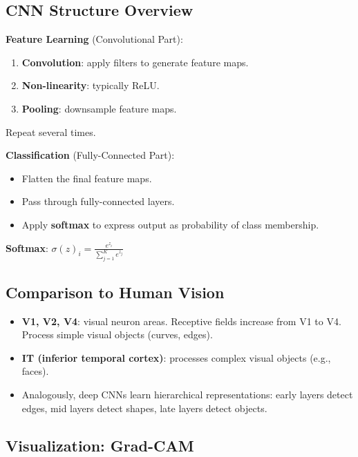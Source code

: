 \documentclass[11pt,a4paper]{article}
\begin{document}
\subsection{CNN Structure Overview}

\begin{tcolorbox}[colback=boxgray, colframe=leidenblue, title=\textbf{CNN for Classification}]
\textbf{Feature Learning} (Convolutional Part):
\begin{enumerate}[leftmargin=*]
    \item \textbf{Convolution}: apply filters to generate feature maps.
    \item \textbf{Non-linearity}: typically ReLU.
    \item \textbf{Pooling}: downsample feature maps.
\end{enumerate}
Repeat several times.

\smallskip
\textbf{Classification} (Fully-Connected Part):
\begin{itemize}[leftmargin=*]
    \item Flatten the final feature maps.
    \item Pass through fully-connected layers.
    \item Apply \textbf{softmax} to express output as probability of class membership.
\end{itemize}
\end{tcolorbox}

\textbf{Softmax}: $\sigma(z)_i = \frac{e^{z_i}}{\sum_{j=1}^K e^{z_j}}$

\subsection{Comparison to Human Vision}

\begin{itemize}[leftmargin=*]
    \item \textbf{V1, V2, V4}: visual neuron areas. Receptive fields increase from V1 to V4. Process simple visual objects (curves, edges).
    \item \textbf{IT (inferior temporal cortex)}: processes complex visual objects (e.g., faces).
    \item Analogously, deep CNNs learn hierarchical representations: early layers detect edges, mid layers detect shapes, late layers detect objects.
\end{itemize}

\subsection{Visualization: Grad-CAM}
\end{document}
